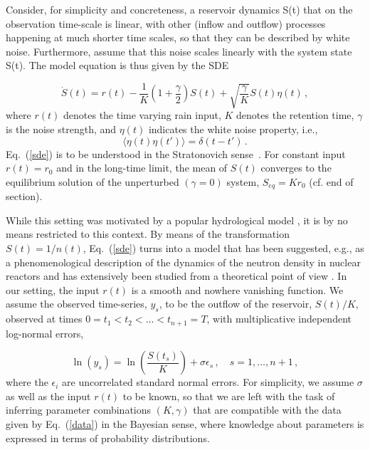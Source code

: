 \documentclass[11pt]{article}
\theoremstyle{definition}
\begin{document}
Consider, for simplicity and concreteness, a reservoir dynamics S(t) that on the observation time-scale is linear, with other (inflow and outflow) processes happening at much shorter time scales, so that they can be described by white noise. Furthermore, assume that this noise scales linearly with the system state S(t). The model equation is thus given by the SDE

\begin{equation}\label{sde}
\dot{S}(t) = r(t) - \frac{1}{K}\left(1+\frac{\gamma}{2}\right) S(t)
+
\sqrt{\frac{\gamma}{K}} S(t){\eta}(t)\,,
\end{equation}
where $r(t)$ denotes the time varying rain input, $K$ denotes the retention time, $\gamma$ is the noise strength, and $\eta(t)$ indicates the white noise property, i.e.,
\begin{equation}\label{whitenoise}
\langle\eta(t)\eta(t')\rangle = \delta(t-t')\,.
\end{equation}
Eq.~(\ref{sde}) is to be understood in the Stratonovich sense~\cite{stratonovich_1968}.
For constant input $r(t) = r_0$ and in the long-time limit, the mean of $S(t)$ converges to the equilibrium solution of the unperturbed $(\gamma = 0)$ system, $S_{eq} = Kr_{0}$ (cf. end of section).



While this setting was motivated by a popular hydrological model \cite{breinholt_2011_SDE, livina_2003_dischargeFluctuations}, it is by no means restricted to this context. By means of the transformation $S(t) = 1/n(t)$, Eq.~(\ref{sde}) turns into a model that has been suggested, e.g., as a phenomenological description of the dynamics of the neutron density in nuclear reactors \cite{dutre_1977_SDE} and has extensively been studied from a theoretical point of view \cite{schenzle_1979_multStochProc, fujisaka_1986_intermittency}.
In our setting, the input $r(t)$ is a smooth and nowhere vanishing function. We assume the observed time-series, $y_s$, to be the outflow of the reservoir, $S(t)/K$, observed at times $0=t_1<t_2<\dots < t_{n+1}=T$, with multiplicative independent log-normal errors,

\begin{equation}\label{data}
  \ln \left( y_s \right)
  =
  \ln \left( \frac{S(t_s)}{K} \right)
  +
  \sigma\epsilon_s\,,\quad s=1,\dots,n+1\,,
\end{equation}
where the $\epsilon_i$ are uncorrelated standard normal errors.
For simplicity, we assume $\sigma$ as well as the input $r(t)$ to be known, so that we are left with the task of inferring parameter combinations $(K,\gamma)$ that are compatible with the data given by Eq.~(\ref{data}) in the Bayesian sense, where knowledge about parameters is expressed in terms of probability distributions.
\end{document}
